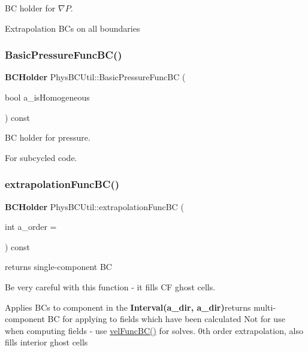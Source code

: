 BC holder for $ \nabla P $. 

Extrapolation B\+Cs on all boundaries \mbox{\label{class_phys_b_c_util_ad0cfd2f6a56078706972627cf6acd642}} 
\subsubsection{\texorpdfstring{Basic\+Pressure\+Func\+B\+C()}{BasicPressureFuncBC()}}
{\footnotesize\ttfamily \textbf{ B\+C\+Holder} Phys\+B\+C\+Util\+::\+Basic\+Pressure\+Func\+BC (\begin{DoxyParamCaption}\item[{bool}]{a\+\_\+is\+Homogeneous }\end{DoxyParamCaption}) const\hspace{0.3cm}{\ttfamily [virtual]}}



BC holder for pressure. 

For subcycled code. \mbox{\label{class_phys_b_c_util_a8dd3f2fd42f64e02bdaba7ca01952c5b}} 
\subsubsection{\texorpdfstring{extrapolation\+Func\+B\+C()}{extrapolationFuncBC()}}
{\footnotesize\ttfamily \textbf{ B\+C\+Holder} Phys\+B\+C\+Util\+::extrapolation\+Func\+BC (\begin{DoxyParamCaption}\item[{int}]{a\+\_\+order = {} }\end{DoxyParamCaption}) const\hspace{0.3cm}{\ttfamily [virtual]}}



returns single-\/component BC 

Be very careful with this function -\/ it fills CF ghost cells.

Applies B\+Cs to component in the \textbf{ Interval(a\+\_\+dir, a\+\_\+dir)}returns multi-\/component BC for applying to fields which have been calculated Not for use when computing fields -\/ use \hyperlink{class_phys_b_c_util_a68ef94f8d4002dabc19e7a24a671943e}{vel\+Func\+B\+C()} for solves. 0th order extrapolation, also fills interior ghost cells \mbox{\label{class_phys_b_c_util_ae13f736d6b1f4bd5a306b226d7303bb3}} 

